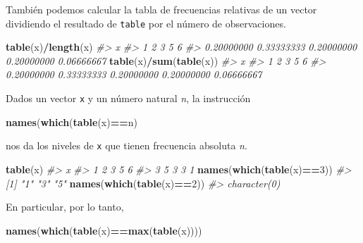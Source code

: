 \documentclass[
]{book}
\newenvironment{Shaded}{\begin{snugshade}}{\end{snugshade}}
\newcommand{\CommentTok}[1]{\textcolor[rgb]{0.56,0.35,0.01}{\textit{#1}}}
\newcommand{\DecValTok}[1]{\textcolor[rgb]{0.00,0.00,0.81}{#1}}
\newcommand{\KeywordTok}[1]{\textcolor[rgb]{0.13,0.29,0.53}{\textbf{#1}}}
\newcommand{\NormalTok}[1]{#1}
\newcommand{\OperatorTok}[1]{\textcolor[rgb]{0.81,0.36,0.00}{\textbf{#1}}}
\theoremstyle{definition}
\theoremstyle{definition}
\theoremstyle{definition}
\theoremstyle{remark}
\begin{document}
También podemos calcular la tabla de frecuencias relativas de un vector dividiendo el resultado de \texttt{table} por el número de observaciones.

\begin{Shaded}
\begin{Highlighting}[]
\KeywordTok{table}\NormalTok{(x)}\OperatorTok{/}\KeywordTok{length}\NormalTok{(x)}
\CommentTok{\#\textgreater{} x}
\CommentTok{\#\textgreater{}          1          2          3          5          6 }
\CommentTok{\#\textgreater{} 0.20000000 0.33333333 0.20000000 0.20000000 0.06666667}
\KeywordTok{table}\NormalTok{(x)}\OperatorTok{/}\KeywordTok{sum}\NormalTok{(}\KeywordTok{table}\NormalTok{(x))}
\CommentTok{\#\textgreater{} x}
\CommentTok{\#\textgreater{}          1          2          3          5          6 }
\CommentTok{\#\textgreater{} 0.20000000 0.33333333 0.20000000 0.20000000 0.06666667}
\end{Highlighting}
\end{Shaded}

Dados un vector \texttt{x} y un número natural \emph{n}, la instrucción

\begin{Shaded}
\begin{Highlighting}[]
\KeywordTok{names}\NormalTok{(}\KeywordTok{which}\NormalTok{(}\KeywordTok{table}\NormalTok{(x)}\OperatorTok{==}\NormalTok{n)}
\end{Highlighting}
\end{Shaded}

nos da los niveles de \texttt{x} que tienen frecuencia absoluta \emph{n}.

\begin{Shaded}
\begin{Highlighting}[]
\KeywordTok{table}\NormalTok{(x)}
\CommentTok{\#\textgreater{} x}
\CommentTok{\#\textgreater{} 1 2 3 5 6 }
\CommentTok{\#\textgreater{} 3 5 3 3 1}
\KeywordTok{names}\NormalTok{(}\KeywordTok{which}\NormalTok{(}\KeywordTok{table}\NormalTok{(x)}\OperatorTok{==}\DecValTok{3}\NormalTok{))}
\CommentTok{\#\textgreater{} [1] "1" "3" "5"}
\KeywordTok{names}\NormalTok{(}\KeywordTok{which}\NormalTok{(}\KeywordTok{table}\NormalTok{(x)}\OperatorTok{==}\DecValTok{2}\NormalTok{))}
\CommentTok{\#\textgreater{} character(0)}
\end{Highlighting}
\end{Shaded}

En particular, por lo tanto,

\begin{Shaded}
\begin{Highlighting}[]
\KeywordTok{names}\NormalTok{(}\KeywordTok{which}\NormalTok{(}\KeywordTok{table}\NormalTok{(x)}\OperatorTok{==}\KeywordTok{max}\NormalTok{(}\KeywordTok{table}\NormalTok{(x))))}
\end{Highlighting}
\end{Shaded}
\end{document}

